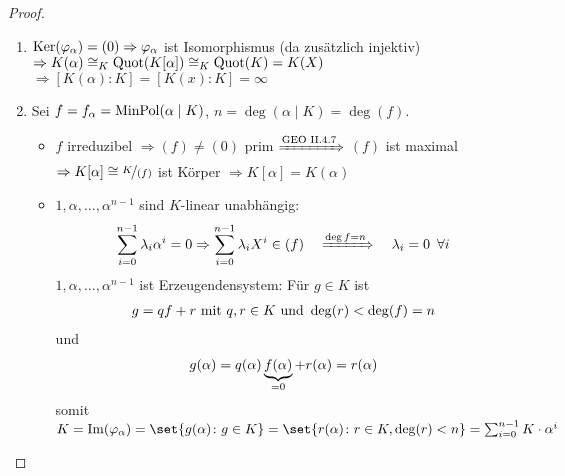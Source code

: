 \begin{proof}
	\begin{enumerate}[label=(\alph*)]
		\item $\operatorname{Ker}(\varphi_\alpha) = (0) \Rightarrow \varphi_\alpha$ ist Isomorphismus (da zusätzlich injektiv) \\
		$\Rightarrow K(\alpha) \cong_K \operatorname{Quot}(K[\alpha]) \cong_K \operatorname{Quot}(K) = K(X)$ \\
		$\Rightarrow [K(\alpha) \colon K] = [K(x) \colon K] = \infty$
		\item Sei $f = f_\alpha = \operatorname{MinPol}(\alpha \mid K)$, $n = \deg(\alpha \mid K) = \deg(f)$.
		\begin{itemize}
			\item $f$ irreduzibel $\Rightarrow (f) \neq (0)$ prim ${\xRightarrow{\text{GEO II.4.7}}}$ $(f)$ ist maximal \\
			$\Rightarrow K[\alpha] \cong \lnkset{K}{(f)}$ ist Körper $\Rightarrow K[\alpha] = K(\alpha)$
			\item $1, \alpha, \dots , \alpha^{n-1}$ sind $K$-linear unabhängig: 
			\begin{align}
			\sum_{i=0}^{n-1} \lambda_i \alpha^i = 0 \Rightarrow \sum_{i=0}^{n-1} \lambda_i X^i \in (f) \quad \xRightarrow{\deg f = n} \quad \lambda_i = 0 \enskip \forall i \notag
			\end{align}
			$1, \alpha, \dots , \alpha^{n-1}$ ist Erzeugendensystem: Für $g \in K$ ist 
			\begin{align}
			g = qf + r \text{ mit } q,r \in K \text{ und } \deg(r) < \deg(f) = n \notag
			\end{align}
			und  
			\begin{align}
			g(\alpha) = q(\alpha) \underbrace{f(\alpha)}_{=0} + r(\alpha) = r(\alpha) \notag
			\end{align}
			somit $K = \Image(\phi_\alpha) = \set{g(\alpha) \colon g \in K} = \set{r(\alpha) \colon r \in K, \deg(r) < n} = \sum_{i=0}^{n-1} K \cdot \alpha^i$
		\end{itemize}
	\end{enumerate}
\end{proof}

